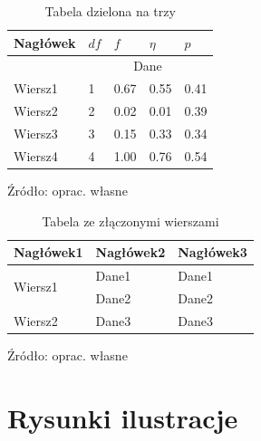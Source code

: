 \documentclass[twoside,a4paper,12pt]{report} %
\theoremstyle{break}
\begin{document}
\lipsum[1]

\begin{table}[ht]
  \begin{threeparttable}
    \caption{Tabela dzielona na trzy}
     \label{tab:tab2}
     \begin{tabular}{lllll}
        \toprule
        Nagłówek & \( df \) & \( f \) & \( \eta \) & \( p \) \\
        \midrule
                 &  \multicolumn{4}{c}{Dane}     \\
        Wiersz1    & 1        & 0.67    & 0.55       & 0.41    \\
        Wiersz2    & 2        & 0.02    & 0.01       & 0.39    \\
        Wiersz3    & 3        & 0.15    & 0.33       & 0.34    \\
        Wiersz4    & 4        & 1.00    & 0.76       & 0.54    \\
        \bottomrule
     \end{tabular}
    \begin{tablenotes}
      \small
      \item Źródło: oprac. własne
    \end{tablenotes}
  \end{threeparttable}
\end{table}

\lipsum[1]

\begin{table}[ht]
\caption{Tabela ze złączonymi wierszami}
\label{tab:tab3}
\begin{tabular}{|l|l|p{4cm}|}
\hline
    Nagłówek1 & Nagłówek2 & Nagłówek3 \\ \hline
   \multirow{2}{*}{Wiersz1} & Dane1 & Dane1 \\
   & Dane2 & Dane2  \\ \hline
    Wiersz2 & Dane3 & Dane3 \\ \hline
\end{tabular}
\begin{tablenotes}
      \small
      \item Źródło: oprac. własne
    \end{tablenotes}
\end{table}

\lipsum[1]

\section{Rysunki ilustracje}
\end{document}
